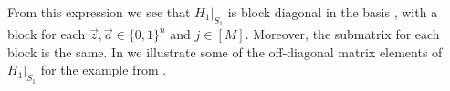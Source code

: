 \documentclass[../thesis-main/thesis-main]{subfiles}
\begin{document}
\newcommand{\configtrans}[2]{
\configex{#1}
$~\longrightarrow~$
\configex{#2}
}
%
%
%

From this expression we see that $H_{1}|_{S_1}$ is block diagonal in the basis , with a block for each $\vec{z},\vec{a}\in\{0,1\}^{n}$ and $j\in[M]$. Moreover, the submatrix for each block is the same. In  we illustrate some of the off-diagonal matrix elements of $H_{1}|_{S_{1}}$ for the example from .
\end{document}
